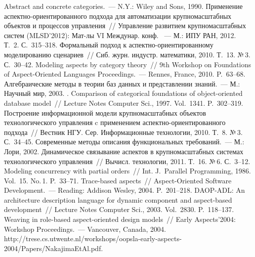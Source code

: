 \begin{multicols}{2}
{{\begin{thebibliography}{99}
 Abstract and concrete categories.~--- 
N.Y.: Wiley and Sons, 1990.
 Применение аспектно-ори\-ен\-ти\-ро\-ван\-но\-го подхода для 
автоматизации крупномасштабных объектов и процессов управления~// Управление 
развитием крупномасштабных систем (MLSD'2012): Мат-лы VI Междунар. конф. ~--- 
М.: ИПУ РАН, 2012. Т.~2. С.~315--318.
 Формальный подход к ас\-пект\-но-ори\-ен\-ти\-ро\-ван\-но\-му 
моделированию сценариев~// Сиб. журн. индустр. математики, 2010. Т.~13. №\,3. С.~30--42.
 Modeling aspects by category theory~// 9th Workshop on Foundations of 
Aspect-Oriented Languages Proceedings.~--- Rennes, France, 2010. P.~63--68.
 Алгебраические методы в теории баз данных и представлении 
знаний.~--- М.: Научный мир, 2003.
. Comparison of categorical foundations of 
object-oriented database model~// Lecture Notes Computer Sci., 1997. Vol.~1341. P.~302--319.
 Построение информационной модели крупномасштабных объектов 
технологического управления c применением ас\-пект\-но-ори\-ен\-ти\-ро\-ван\-но\-го 
подхода~// Вестник НГУ. Сер. Информационные технологии, 2010. Т.~8. №\,3. С.~34--45.
 Современные методы описания функциональных требований.~--- М.: Лори, 
2002.
 Динамическое связывание аспектов в 
крупномасштабных системах технологического управления~// Вычисл. технологии, 2011. 
Т.~16. №\,6. С.~3--12.
 Modeling concurrency with partial orders~// Int. J.~Parallel Programming, 1986. 
Vol.~15. No.\,1. P.~33--71.
 Trace-based aspects~// Aspect-Oriented Software 
Development.~--- Reading: Addison Wesley, 2004. P.~201--218.
DAOP-ADL: An architecture description language for dynamic component and aspect-based 
development~// Lecture Notes Computer Sci., 2003. Vol.~2830. P.~118--137.
Weaving in role-based aspect-oriented design models~// Early Aspects'2004: Workshop 
Proceedings.~--- Vancouver, Canada, 2004. 
{\sf http://trese.cs.utwente.nl/workshops/oopsla-early-aspects-2004/Papers/NakajimaEtAl.pdf}.

\end{thebibliography}}}
\end{multicols}
